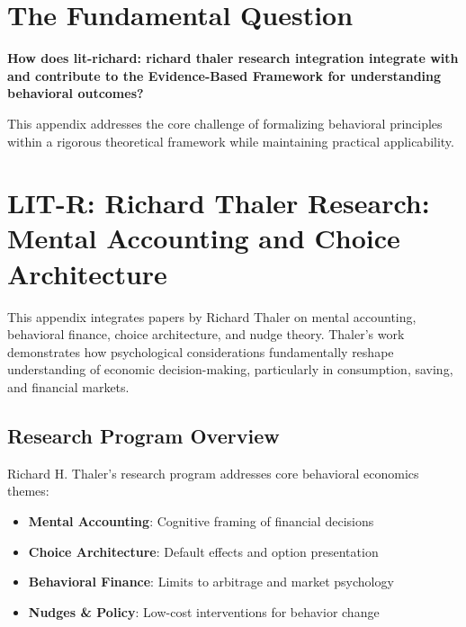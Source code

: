 \section{The Fundamental Question}
\label{sec:thl-fundamental}

\begin{tcolorbox}[
    colback=red!5!white,
    colframe=red!75!black,
    title={\textbf{Fundamental Question}}
]
\textbf{How does lit-richard: richard thaler research integration integrate with and contribute to the
Evidence-Based Framework for understanding behavioral outcomes?}

This appendix addresses the core challenge of formalizing behavioral principles
within a rigorous theoretical framework while maintaining practical applicability.
\end{tcolorbox}




\section{LIT-R: Richard Thaler Research: Mental Accounting and Choice Architecture}
\label{app:litr}

This appendix integrates papers by Richard Thaler on mental accounting,
behavioral finance, choice architecture, and nudge theory. Thaler's work demonstrates how
psychological considerations fundamentally reshape understanding of economic decision-making,
particularly in consumption, saving, and financial markets.

\subsection{Research Program Overview}

Richard H. Thaler's research program addresses core behavioral economics themes:

\begin{itemize}
  \item \textbf{Mental Accounting}: Cognitive framing of financial decisions
  \item \textbf{Choice Architecture}: Default effects and option presentation
  \item \textbf{Behavioral Finance}: Limits to arbitrage and market psychology
  \item \textbf{Nudges & Policy}: Low-cost interventions for behavior change
\end{itemize}

